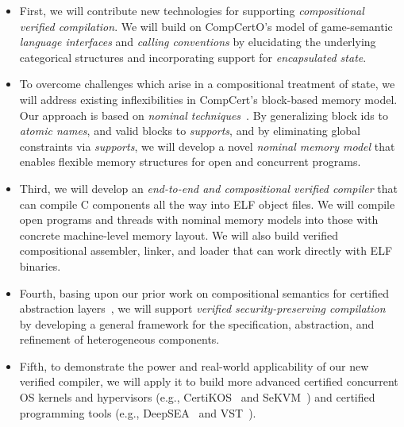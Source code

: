 \begin{itemize}
\item First, we will contribute new technologies for supporting {\em
  compositional verified compilation}.
  We will build on CompCertO's model of
  game-semantic {\em language interfaces} and {\em calling conventions}
  by elucidating the underlying categorical structures
  and incorporating support for {\em encapsulated state}.
\item To overcome challenges which arise
  in a compositional treatment of state,
  we will address existing inflexibilities
  in CompCert's block-based memory model.
  Our approach is based on \emph{nominal
  techniques}~\cite{pitts-nominal,gabby2002}. By generalizing block
  ids to {\em atomic names}, and valid blocks to {\em supports}, and by
  eliminating global constraints via {\em supports}, we will develop a
  novel {\em nominal memory model} that enables flexible memory
  structures for open and concurrent programs.
\item Third, we will develop an {\em end-to-end and compositional
  verified compiler} that can compile C components all the way into
  ELF object files. We will compile open programs and threads with
  nominal memory models into those with concrete machine-level memory
  layout. We will also build verified compositional assembler,
  linker, and loader that can work directly with ELF binaries.
\item Fourth, basing upon our prior work on compositional semantics
  for certified abstraction layers~\cite{dscal15,ccal18,koenig20,layered22},
  we will support {\em verified security-preserving
  compilation}~\cite{costanzo16} by developing a general framework
  for the specification, abstraction, and refinement of heterogeneous
  components.
\item Fifth, to demonstrate the power and real-world applicability of
  our new verified compiler, we will apply it to build more advanced
  certified concurrent OS kernels and hypervisors (e.g., CertiKOS~\cite{certikos-osdi16}
  and SeKVM~\cite{sekvm21a,sekvm21b,tao21}) and certified programming tools
    (e.g., DeepSEA~\cite{deepsea19} and VST~\cite{appel11:vst}).
\end{itemize}
